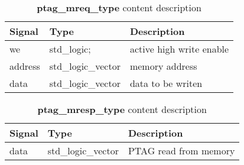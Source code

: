 \begin{table}[H]
\centering
\label{table:pmrqtype}
\begin{tabular}{l l p{55mm}}
\textbf{Signal} & \textbf{Type}      & \textbf{Description}                     \\ \hline \hline
we      & std\_logic;                 & active high write enable                \\ \hline
address & std\_logic\_vector           & memory address                         \\ \hline
data    & std\_logic\_vector           & data to be writen                      \\ \hline
\end{tabular}                                                                                                                                   
\caption{\textbf{ptag\_mreq\_type} content description}                                                                                              
\end{table}     

\begin{table}[H]
\centering
\label{table:pmrtype}
\begin{tabular}{l l p{55mm}}
\textbf{Signal} & \textbf{Type}      & \textbf{Description}                     \\ \hline \hline
data 		& std\_logic\_vector   & PTAG read from memory                  \\ \hline
 \end{tabular}                                                                                                                                   
\caption{\textbf{ptag\_mresp\_type} content description}                                                                                              
\end{table}    




